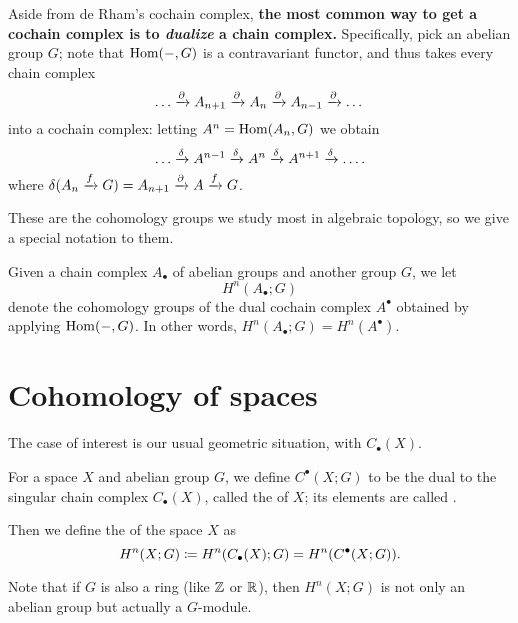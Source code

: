 Aside from de Rham's cochain complex,
\textbf{the most common way to get a cochain complex
is to \emph{dualize} a chain complex.}
Specifically, pick an abelian group $G$;
note that $\operatorname{Hom}(-, G)$ is a contravariant functor,
and thus takes every chain complex
\[ \dots \xrightarrow{\partial} A_{n+1} \xrightarrow{\partial}
	A_n \xrightarrow{\partial} A_{n-1} \xrightarrow{\partial} \dots \]
into a cochain complex: letting $A^n = \operatorname{Hom}(A_n, G)$ we obtain
\[ \dots \xrightarrow{\delta} A^{n-1} \xrightarrow{\delta}
	A^n \xrightarrow{\delta} A^{n+1} \xrightarrow{\delta} \dots. \]
where $\delta(A_n \xrightarrow{f} G) = A_{n+1} \xrightarrow{\partial} A \xrightarrow{f} G$.

These are the cohomology groups we study most in algebraic topology,
so we give a special notation to them.
\begin{definition}
	Given a chain complex $A_\bullet$ of abelian groups and another group $G$,
	we let \[ H^n(A_\bullet; G) \] denote the cohomology groups
	of the dual cochain complex $A^\bullet$ obtained by applying $\operatorname{Hom}(-,G)$.
	In other words, $H^n(A_\bullet; G) = H^n(A^\bullet)$.
\end{definition}

\section{Cohomology of spaces}

The case of interest is our usual geometric situation, with $C_\bullet(X)$.
\begin{definition}
	For a space $X$ and abelian group $G$,
	we define $C^\bullet(X;G)$ to be the dual to the
	singular chain complex $C_\bullet(X)$,
	called the  of $X$;
	its elements are called .

	Then we define the 
	of the space $X$ as
	\[ H^n(X; G) \coloneqq H^n(C_\bullet(X); G) = H^n(C^\bullet(X;G)). \]
\end{definition}
\begin{remark}
	Note that if $G$ is also a ring (like $\mathbb Z$ or $\mathbb R$),
	then $H^n(X; G)$ is not only an abelian group but actually a $G$-module.
\end{remark}


